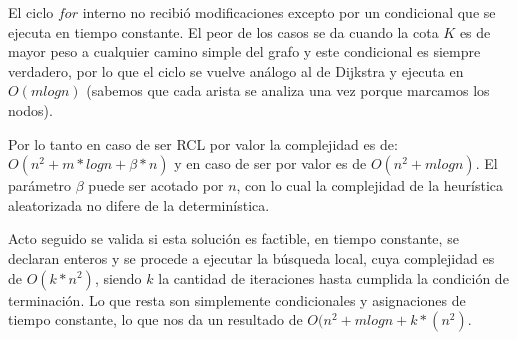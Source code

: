 \vspace{2mm}
   
   El ciclo $for$ interno no recibi\'o modificaciones excepto por un condicional que se ejecuta en tiempo constante. El peor de los casos se da cuando la cota $K$ es de mayor peso a cualquier camino simple del grafo y este condicional es siempre verdadero, por lo que el ciclo se vuelve an\'alogo al de Dijkstra y ejecuta en $O(mlogn)$ (sabemos que cada arista se analiza una vez porque marcamos los nodos).

\vspace{2mm}

Por lo tanto en caso de ser RCL por valor la complejidad es de: $O(n^2 + m * logn + \beta * n )$ y en caso de ser por valor es de $O(n^2 + m log n)$. El par\'ametro $\beta$ puede ser acotado por $n$, con lo cual la complejidad de la heur\'istica aleatorizada no difere de la determin\'istica.


\vspace{2mm}

Acto seguido se valida si esta soluci\'on es factible, en tiempo constante, se declaran enteros y se procede a ejecutar la b\'usqueda local, cuya complejidad es de $O(k*n^2)$, siendo $k$ la cantidad de iteraciones hasta cumplida la condici\'on de terminaci\'on. Lo que resta son simplemente condicionales y asignaciones de tiempo constante, lo que nos da un resultado de $O(n^2 + m log n + k*(n^2)$.


